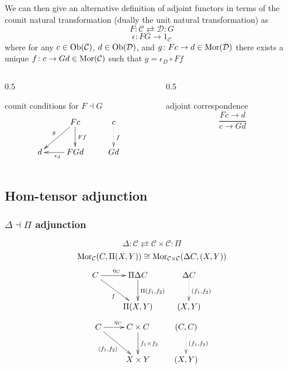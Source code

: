 \begin{frame}
We can then give an alternative definition of adjoint functors in terms of the counit natural transformation (dually the unit natural transformation) as
$$
F \colon \mathcal{C} \rightleftarrows \mathcal{D} \colon G
$$
$$
\epsilon \colon FG \rightarrow 1_{\mathcal{C}}
$$
where for any $c \in \mathop{\rm Ob}\nolimits (\mathcal{C})$, $d \in \mathop{\rm Ob}\nolimits (\mathcal{D})$, and $g \colon Fc \rightarrow d \in \mathop{\rm Mor}\nolimits(\mathcal{D})$ there exists a unique $f \colon c \rightarrow Gd \in \mathop{\rm Mor}\nolimits(\mathcal{C})$ such that $g = \epsilon_D \circ Ff$	
\begin{columns}[t]
    \begin{column}{0.5\framewidth}
\begin{block}{counit conditions for $F \dashv G$}
$$
			\xymatrix{
			& F c \ar[d]^{F f} \ar[dl]_{g} & c \ar@{.>}[d]^{f}\\
			d & F G d \ar[l]^{\epsilon_d} & G d}
$$
\end{block}
    \end{column}
    \begin{column}{0.5\framewidth}
		     \begin{block}{adjoint correspondence}
		\abovedisplayskip=0pt
		$$
			\frac{Fc \rightarrow d}{c \rightarrow Gd}
		$$
		\end{block}
    \end{column}
\end{columns}
\end{frame}

\subsection{Hom-tensor adjunction}
\begin{frame}
\frametitle{$\Delta \dashv \Pi$ adjunction}
$$\Delta : \mathcal{C} \rightleftarrows \mathcal{C} \times \mathcal{C}: \Pi$$
$$\mathop{\rm Mor}\nolimits_{\mathcal{C}}(C, \Pi (X,Y)) \cong  \mathop{\rm Mor}\nolimits_{\mathcal{C} \times \mathcal{C}}(\Delta C, (X,Y))$$
			$$
			\xymatrix{
			C \ar[r]^{\eta_C} \ar[dr]_{f} & \Pi \Delta C \ar[d]^{\Pi (f_1, f_2)} & \Delta C \ar@{.>}[d]^{(f_1,f_2)}\\
			& \Pi (X,Y) & (X,Y)}
			$$
			$$
			\xymatrix{
			C \ar[r]^{\eta_C} \ar[dr]_{\langle f_1, f_2 \rangle} & C \times C \ar[d]^{f_1 \times f_2} & (C,C) \ar@{.>}[d]^{(f_1,f_2)}\\
			& X \times Y & (X,Y)}
			$$
\end{frame}

